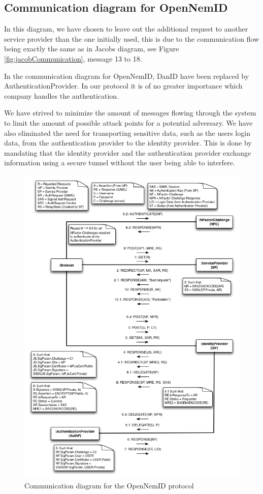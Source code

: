\documentclass[twosided]{report}
\begin{document}
\subsection{Communication diagram for OpenNemID}
In this diagram, we have chosen to leave out the additional request to another service provider than the one initially used, this is due to the communication flow being exactly the same as in Jacobs diagram, see Figure \ref{fig:jacobCommunication}, message 13 to 18.
\par
In the communication diagram for OpenNemID, DanID have been replaced by AuthenticationProvider. In our protocol it is of no greater importance which company handles the authentication.
\par
We have strived to minimize the amount of messages flowing through the system to limit the amount of possible attack points for a potential adversary. We have also eliminated the need for transporting sensitive data, such as the users login data, from the authentication provider to the identity provider. This is done by mandating that the identity provider and the authentication provider exchange information using a secure tunnel without the user being able to interfere.

\begin{figure}[H]
	\centering
	\includegraphics[scale=0.6]{images/Communication.png}
	\caption{Communication diagram for the OpenNemID protocol}
	\label{fig:ourCommunication}
\end{figure}
\end{document}
